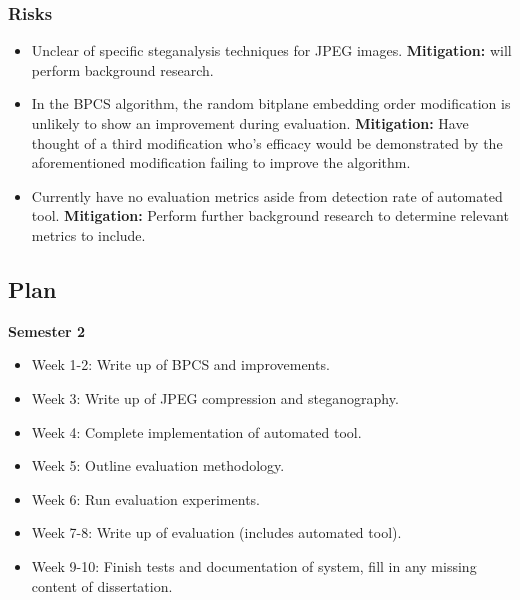 \documentclass[11pt]{article}
\begin{document}
\subsubsection{Risks}\label{risks}

\begin{itemize}
    \item Unclear of specific steganalysis techniques for JPEG images. \textbf{Mitigation:} will perform background research. 
    \item In the BPCS algorithm, the random bitplane embedding order modification is unlikely to show an improvement during evaluation. \textbf{Mitigation:} Have thought of a third modification who's efficacy would be demonstrated by the aforementioned modification failing to improve the algorithm.
    \item Currently have no evaluation metrics aside from detection rate of automated tool. \textbf{Mitigation:} Perform further background research to determine relevant metrics to include.
\end{itemize}

\subsection{Plan}\label{plan}
\textbf{Semester 2}
\begin{itemize}
    \item Week 1-2: Write up of BPCS and improvements.
    \item Week 3: Write up of JPEG compression and steganography.
    \item Week 4: Complete implementation of automated tool.
    \item Week 5: Outline evaluation methodology.
    \item Week 6: Run evaluation experiments.
    \item Week 7-8: Write up of evaluation (includes automated tool).
    \item Week 9-10: Finish tests and documentation of system, fill in any missing content of dissertation.
    
\end{itemize}
\end{document}
